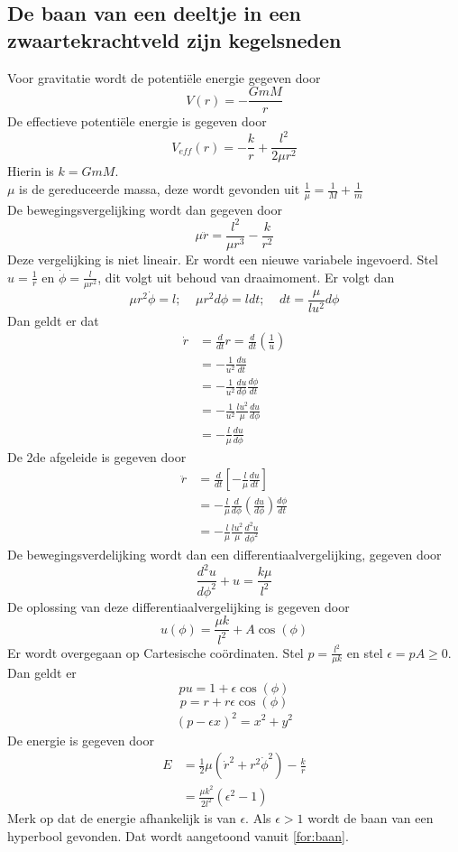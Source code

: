\subsection{De baan van een deeltje in een zwaartekrachtveld zijn kegelsneden}
Voor gravitatie wordt de potentiële energie gegeven door
$$V(r)=-\frac{GmM}{r}$$
De effectieve potentiële energie is gegeven door
$$V_{eff}(r)=-\frac{k}{r}+\frac{l^{2}}{2\mu r^{2}}$$
Hierin is $k=GmM$.\\
$\mu$ is de gereduceerde massa, deze wordt gevonden uit $\frac{1}{\mu}=\frac{1}{M}+\frac{1}{m}$\\
De bewegingsvergelijking wordt dan gegeven door
$$\mu\ddot{r}=\frac{l^{2}}{\mu r^{3}}-\frac{k}{r^{2}}$$
Deze vergelijking is niet lineair. Er wordt een nieuwe variabele ingevoerd. Stel $u=\frac{1}{r}$ en $\dot{\phi}=\frac{l}{\mu r^{2}}$, dit volgt uit behoud van draaimoment. Er volgt dan
$$\mu r^{2}\dot{\phi}=l;\ \ \ \ \ \mu r^{2}d\phi=ldt;\ \ \ \ \ dt=\frac{\mu}{lu^{2}}d\phi$$
Dan geldt er dat
\begin{align}
\dot{r}&=\frac{d}{dt}r=\frac{d}{dt}\left(\frac{1}{u}\right) \nonumber \\
&=-\frac{1}{u^{2}}\frac{du}{dt} \nonumber \\
&=-\frac{1}{u^{2}}\frac{du}{d\phi}\frac{d\phi}{dt} \nonumber \\
&=-\frac{1}{u^{2}}\frac{lu^{2}}{\mu}\frac{du}{d\phi} \nonumber \\
&=-\frac{l}{\mu}\frac{du}{d\phi} \nonumber 
\end{align}
De 2de afgeleide is gegeven door
\begin{align}
\ddot{r}&=\frac{d}{dt}\left[-\frac{l}{\mu}\frac{du}{dt}\right] \nonumber \\
&=-\frac{l}{\mu}\frac{d}{d\phi}\left(\frac{du}{d\phi}\right)\frac{d\phi}{dt} \nonumber \\
&=-\frac{l}{\mu}\frac{lu^{2}}{\mu}\frac{d^{2}u}{d\phi^{2}} \nonumber 
\end{align}
De bewegingsverdelijking wordt dan een differentiaalvergelijking, gegeven door
$$\frac{d^{2}u}{d\phi^{2}}+u=\frac{k\mu}{l^{2}}$$
De oplossing van deze differentiaalvergelijking is gegeven door
$$u(\phi)=\frac{\mu k}{l^{2}}+A\cos(\phi)$$
Er wordt overgegaan op Cartesische coördinaten. Stel $p=\frac{l^{2}}{\mu k}$ en stel $\epsilon=pA\geq0$. Dan geldt er
$$pu=1+\epsilon\cos(\phi)$$
$$p=r+r\epsilon \cos(\phi)$$
\begin{align}
    (p-\epsilon x)^{2}=x^{2}+y^{2} 
    \label{for:baan}
\end{align}
De energie is gegeven door
\begin{align}
    E&=\frac{1}{2}\mu(\dot{r}^{2}+r^{2}\dot{\phi}^{2})-\frac{k}{r}\nonumber \\
    &=\frac{\mu k^{2}}{2l^{2}}(\epsilon^{2}-1)
    \label{for: energie}
\end{align}
Merk op dat de energie afhankelijk is van $\epsilon$. Als $\epsilon > 1$ wordt de baan van een hyperbool gevonden. Dat wordt aangetoond vanuit \cref{for:baan}.


